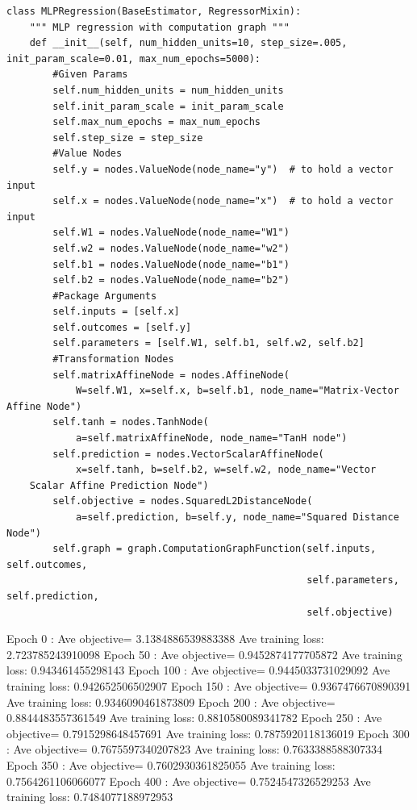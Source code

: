 \documentclass{article}
\theoremstyle{plain}
\theoremstyle{definition}
\begin{document}
\begin{enumerate}
\begin{verbatim}
class MLPRegression(BaseEstimator, RegressorMixin):
    """ MLP regression with computation graph """
    def __init__(self, num_hidden_units=10, step_size=.005, init_param_scale=0.01, max_num_epochs=5000):
        #Given Params
        self.num_hidden_units = num_hidden_units
        self.init_param_scale = init_param_scale
        self.max_num_epochs = max_num_epochs
        self.step_size = step_size
        #Value Nodes
        self.y = nodes.ValueNode(node_name="y")  # to hold a vector input
        self.x = nodes.ValueNode(node_name="x")  # to hold a vector input
        self.W1 = nodes.ValueNode(node_name="W1")
        self.w2 = nodes.ValueNode(node_name="w2")
        self.b1 = nodes.ValueNode(node_name="b1")
        self.b2 = nodes.ValueNode(node_name="b2")
        #Package Arguments
        self.inputs = [self.x]
        self.outcomes = [self.y]
        self.parameters = [self.W1, self.b1, self.w2, self.b2]
        #Transformation Nodes
        self.matrixAffineNode = nodes.AffineNode(
            W=self.W1, x=self.x, b=self.b1, node_name="Matrix-Vector Affine Node")
        self.tanh = nodes.TanhNode(
            a=self.matrixAffineNode, node_name="TanH node")
        self.prediction = nodes.VectorScalarAffineNode(
            x=self.tanh, b=self.b2, w=self.w2, node_name="Vector
    Scalar Affine Prediction Node")
        self.objective = nodes.SquaredL2DistanceNode(
            a=self.prediction, b=self.y, node_name="Squared Distance Node")
        self.graph = graph.ComputationGraphFunction(self.inputs, self.outcomes,
                                                    self.parameters, self.prediction,
                                                    self.objective)
\end{verbatim}
Epoch  0 : Ave objective= 3.1384886539883388  Ave training loss:  2.723785243910098
Epoch  50 : Ave objective= 0.9452874177705872  Ave training loss:  0.943461455298143
Epoch  100 : Ave objective= 0.9445033731029092  Ave training loss:  0.942652506502907
Epoch  150 : Ave objective= 0.9367476670890391  Ave training loss:  0.9346090461873809
Epoch  200 : Ave objective= 0.8844483557361549  Ave training loss:  0.8810580089341782
Epoch  250 : Ave objective= 0.7915298648457691  Ave training loss:  0.7875920118136019
Epoch  300 : Ave objective= 0.7675597340207823  Ave training loss:  0.7633388588307334
Epoch  350 : Ave objective= 0.7602930361825055  Ave training loss:  0.7564261106066077
Epoch  400 : Ave objective= 0.7524547326529253  Ave training loss:  0.7484077188972953

\end{enumerate}
\end{document}
